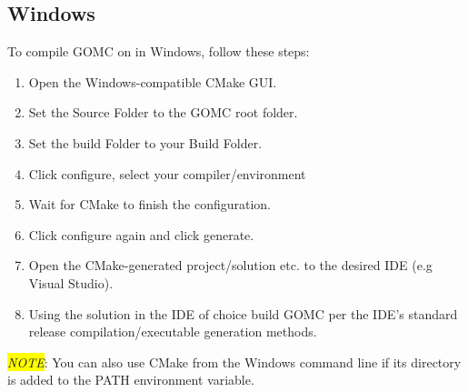 \subsection{Windows}
To compile GOMC on in Windows, follow these steps:
\begin{enumerate}
\item Open the Windows-compatible CMake GUI.
\item Set the Source Folder to the GOMC root folder.
\item Set the build Folder to your Build Folder.
\item Click configure, select your compiler/environment
\item Wait for CMake to finish the configuration.
\item Click configure again and click generate.
\item Open the CMake-generated project/solution etc. to the desired IDE (e.g Visual Studio).
\item Using the solution in the IDE of choice build GOMC per the IDE's standard release compilation/executable generation methods.
\end{enumerate}

\textit{\colorbox{yellow}{NOTE}}: You can also use CMake from the Windows command line if its directory is added to the PATH environment variable.


